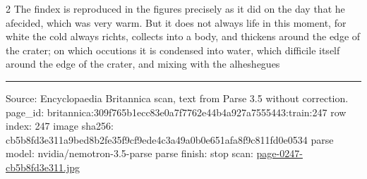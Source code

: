 \documentclass[10pt]{article}
\begin{document}
\begin{multicols}{2}
The findex is reproduced in the figures precisely as it did on the day that he afecided, which was very warm. But it does not always life in this moment, for white the cold always richts, collects into a body, and thickens around the edge of the crater; on which occutions it is condensed into water, which difficile itself around the edge of the crater, and mixing with the alheshegues

\end{multicols}
\vfill\par\noindent\rule{\linewidth}{0.4pt}\par
{\scriptsize\color{gray}\noindent Source: Encyclopaedia Britannica scan, text from Parse 3.5 without correction. page\_id: britannica:309f765b1ecc83e0a7f7762e44b4a927a7555443:train:247 \quad row index: 247 \quad image sha256: cb5b8fd3e311a9bed8b2fe35f9cf9ede4c3a49a0b0e651afa8f9c811fd0e0534 \quad parse model: nvidia/nemotron-3.5-parse \quad parse finish: stop \quad scan: \href{../scans/page-0247-cb5b8fd3e311.jpg}{page-0247-cb5b8fd3e311.jpg}\par}
\end{document}
